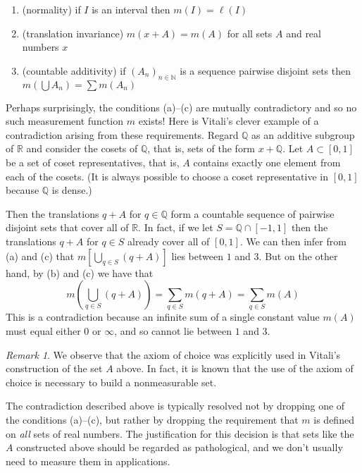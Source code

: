 \documentclass[11pt,oneside]{amsbook}
\newcommand{\N}{\mathbb N}
\newcommand{\Q}{\mathbb Q}
\newcommand{\R}{\mathbb R}
\theoremstyle{definition}
\theoremstyle{plain}
\theoremstyle{definition}
\theoremstyle{remark}
\newtheorem{remark}[theorem]{Remark}
\numberwithin{equation}{section}
\numberwithin{figure}{section}
\begin{document}
\begin{enumerate}
  \item (normality) if $I$ is an interval then $m(I)=\ell(I)$
  \item (translation invariance) $m(x+A)=m(A)$ for all sets $A$ and real numbers $x$
  \item (countable additivity) if $(A_n)_{n\in\N}$ is a sequence pairwise disjoint sets then $m(\bigcup A_n)=\sum m(A_n)$
\end{enumerate}

Perhaps surprisingly, the conditions (a)--(c) are mutually contradictory and so no such measurement function $m$ exists! Here is Vitali's clever example of a contradiction arising from these requirements. Regard $\Q$ as an additive subgroup of $\R$ and consider the cosets of $\Q$, that is, sets of the form $x+\Q$. Let $A\subset[0,1]$ be a set of coset representatives, that is, $A$ contains exactly one element from each of the cosets. (It is always possible to choose a coset representative in $[0,1]$ because $\Q$ is dense.)

Then the translations $q+A$ for $q\in\Q$ form a countable sequence of pairwise disjoint sets that cover all of $\R$. In fact, if we let $S=\Q\cap[-1,1]$ then the translations $q+A$ for $q\in S$ already cover all of $[0,1]$. We can then infer from (a) and (c) that $m[\bigcup_{q\in S}(q+A)]$ lies between $1$ and $3$. But on the other hand, by (b) and (c) we have that
\[m\left(\bigcup_{q\in S}(q+A)\right)=\sum_{q\in S}m(q+A)=\sum_{q\in S}m(A)
\]
This is a contradiction because an infinite sum of a single constant value $m(A)$ must equal either $0$ or $\infty$, and so cannot lie between $1$ and $3$.

\begin{remark}
  We observe that the axiom of choice was explicitly used in Vitali's construction of the set $A$ above. In fact, it is known that the use of the axiom of choice is necessary to build a nonmeasurable set.
\end{remark}

The contradiction described above is typically resolved not by dropping one of the conditions (a)--(c), but rather by dropping the requirement that $m$ is defined on \emph{all} sets of real numbers. The justification for this decision is that sets like the $A$ constructed above should be regarded as pathological, and we don't usually need to measure them in applications.
\end{document}
